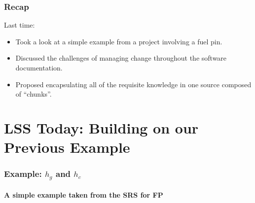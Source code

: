 \documentclass{beamer}
\begin{document}

%


\begin{frame}

\frametitle{Recap}
Last time:
\begin{itemize}
\item Took a look at a simple example from a project involving a fuel pin.
\item Discussed the challenges of managing change throughout the software documentation.
\item Proposed encapsulating all of the requisite knowledge in one source composed of ``chunks''.
\end{itemize}

\end{frame}


\section[Example]{LSS Today: Building on our Previous Example}


\begin{frame}

\frametitle{Example: $h_g$ and $h_c$}

\framesubtitle{A simple example taken from the SRS for FP}



\end{frame}
\end{document}
